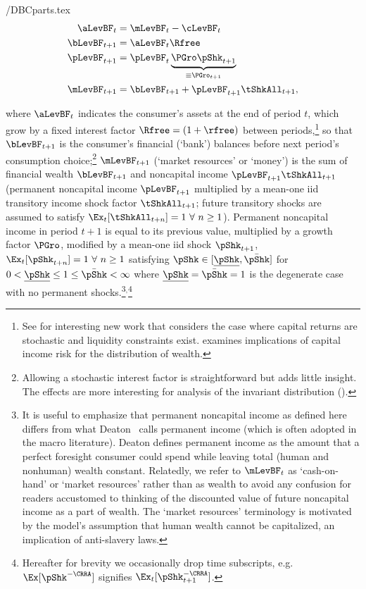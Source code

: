 \documentclass[BufferStockTheory]{subfiles}
\begin{document}
\begin{verbatimwrite}{\EqDir/DBCparts.tex}
  \begin{align}
    \aLevBF_{t}    & = \mLevBF_{t}-\cLevBF_{t}  \label{eq:DBCparts} \\
    \bLevBF_{t+1}    & = \aLevBF_{t} \Rfree \notag \\
    \pLevBF_{t+1}  & = \pLevBF_{t} \underbrace{\PGro\pShk_{t+1}}_{\equiv \PGro_{t+1}}  \notag \\
    \mLevBF_{t+1}  & =  \bLevBF_{t+1} +\pLevBF_{t+1}\tShkAll_{t+1},  \notag
  \end{align}
\end{verbatimwrite}
 where $\aLevBF_{t}$ indicates the consumer's assets at the end of period $t$, which grow by a fixed interest factor $\Rfree =(1+\rfree)$ between periods,\footnote{See \cite{mstCapIncFluct} for interesting new work that considers the case where capital returns are stochastic and liquidity constraints exist.  \cite{benhabibWealth} examines implications of capital income risk for the distribution of wealth.}  so that $\bLevBF_{t+1}$ is the consumer's financial (`bank') balances before next period's consumption choice;\footnote{Allowing a stochastic interest factor is straightforward but adds little insight.  The effects are more interesting for analysis of the invariant distribution (\cite{szeidlInvariant}).} $\mLevBF_{t+1}$ (`market resources' or `money') is the sum of financial wealth $\bLevBF_{t+1}$ and noncapital income $\pLevBF_{t+1}\tShkAll_{t+1}$ (permanent noncapital income $\pLevBF_{t+1}$ multiplied by a mean-one iid transitory income shock factor $\tShkAll_{t+1}$; future transitory shocks are assumed to satisfy $\Ex_{t}[{\tShkAll}_{t+n}]=1~\forall~n\geq 1$). Permanent noncapital income in period $t+1$ is equal to its previous value, multiplied by a growth factor $\PGro$, modified by a mean-one iid shock $\pShk_{t+1}$, $\Ex_{t}[{\pShk}_{t+n}]=1~\forall~n \geq 1$ satisfying $\pShk \in [\ushort{\pShk},\bar{\pShk}]$ for $0 < \ushort{\pShk} \leq 1 \leq \bar{\pShk} < \infty$ where $\ushort{\pShk}=\bar{\pShk}=1$ is the degenerate case with no permanent shocks.\footnote{It is useful to emphasize that permanent noncapital income as defined here differs from what Deaton~\citeyearpar{deatonUnderstandingC} calls permanent income (which is often adopted in the macro literature).  Deaton defines permanent income as the amount that a perfect foresight consumer could spend while leaving total (human and nonhuman) wealth constant.  Relatedly, we refer to $\mLevBF_{t}$ as `cash-on-hand' or `market resources' rather than as wealth to avoid any confusion for readers accustomed to thinking of the discounted value of future noncapital income as a part of wealth.  The `market resources' terminology is motivated by the model's assumption that human wealth cannot be capitalized, an implication of anti-slavery laws.}$^{,}$\footnote{Hereafter for brevity we occasionally drop time subscripts, e.g.\ $\Ex[\pShk^{-\CRRA}]$ signifies $\Ex_{t}[\pShk_{t+1}^{-\CRRA}]$.}
\end{document}
